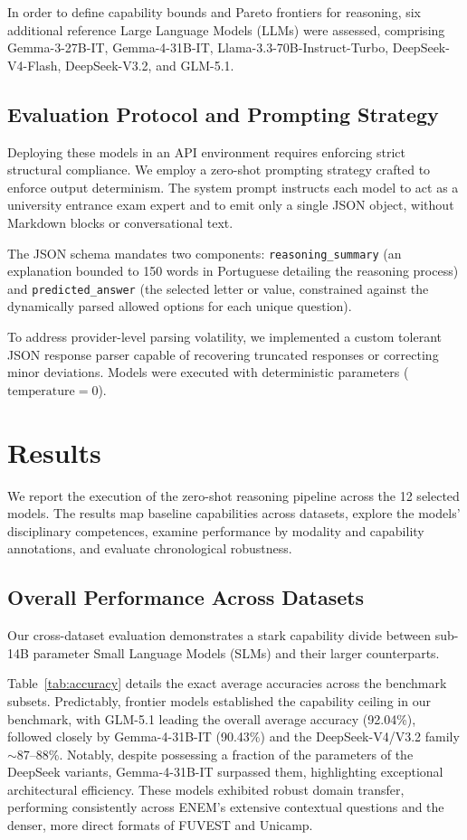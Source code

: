 \documentclass[12pt]{article}
\begin{document}
In order to define capability bounds and Pareto frontiers for reasoning, six additional reference Large Language Models (LLMs) were assessed, comprising Gemma-3-27B-IT, Gemma-4-31B-IT, Llama-3.3-70B-Instruct-Turbo, DeepSeek-V4-Flash, DeepSeek-V3.2, and GLM-5.1.

\subsection{Evaluation Protocol and Prompting Strategy}
Deploying these models in an API environment requires enforcing strict structural compliance. We employ a zero-shot prompting strategy crafted to enforce output determinism. The system prompt instructs each model to act as a university entrance exam expert and to emit only a single JSON object, without Markdown blocks or conversational text.

The JSON schema mandates two components: \texttt{reasoning\_summary} (an explanation bounded to 150 words in Portuguese detailing the reasoning process) and \texttt{predicted\_answer} (the selected letter or value, constrained against the dynamically parsed allowed options for each unique question).

To address provider-level parsing volatility, we implemented a custom tolerant JSON response parser capable of recovering truncated responses or correcting minor deviations. Models were executed with deterministic parameters ($\text{temperature} = 0$).

\section{Results}
\label{sec:results}

We report the execution of the zero-shot reasoning pipeline across the 12 selected models. The results map baseline capabilities across datasets, explore the models' disciplinary competences, examine performance by modality and capability annotations, and evaluate chronological robustness.

\subsection{Overall Performance Across Datasets}
Our cross-dataset evaluation demonstrates a stark capability divide between sub-14B parameter Small Language Models (SLMs) and their larger counterparts.


Table~\ref{tab:accuracy} details the exact average accuracies across the benchmark subsets. Predictably, frontier models established the capability ceiling in our benchmark, with GLM-5.1 leading the overall average accuracy (92.04\%), followed closely by Gemma-4-31B-IT (90.43\%) and the DeepSeek-V4/V3.2 family $\sim$87--88\%. Notably, despite possessing a fraction of the parameters of the DeepSeek variants, Gemma-4-31B-IT surpassed them, highlighting exceptional architectural efficiency. These models exhibited robust domain transfer, performing consistently across ENEM's extensive contextual questions and the denser, more direct formats of FUVEST and Unicamp.
\end{document}
